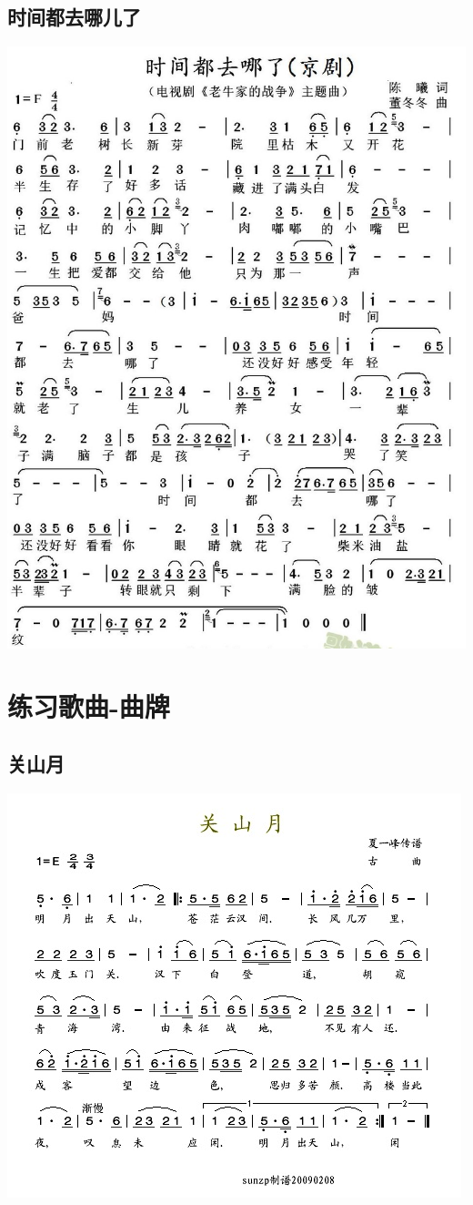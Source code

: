 \documentclass[cn,pad,chinese]{elegantbook}
\begin{document}
\section{时间都去哪儿了}
    \includegraphics[width=\textwidth]{dongxiao/20200411-时间都去哪儿了.jpg} 

\chapter{练习歌曲-曲牌}
\section{关山月}
    \includegraphics[width=\textwidth]{dongxiao/20200411-清平乐-关山月.jpg}
\end{document}
